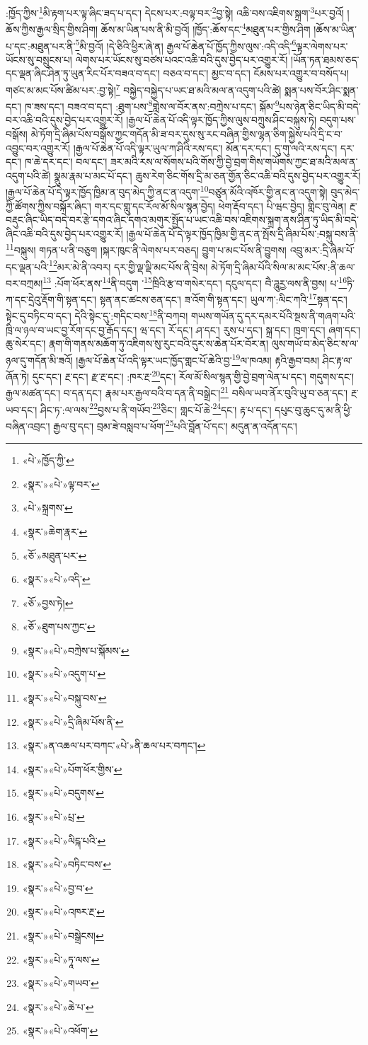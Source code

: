 :ཁྱོད་ཀྱིས་\footnote{«པེ་»ཁྱོད་ཀྱི་}མི་རྟག་པར་ལྟ་ཞིང་ཟད་པ་དང་། དེངས་པར་:བལྟ་བར་\footnote{«སྣར་»«པེ་»ལྟ་བར་}བྱ་སྟེ། འཆི་བས་འཇིགས་སྐྲག་\footnote{«པེ་»སྐྲགས་}པར་བྱའོ། །ཆོས་ཀྱིས་རྒྱལ་སྲིད་གྱིས་ཤིག། ཆོས་མ་ཡིན་པས་ནི་མི་བྱའོ། །ཁྱོད་:ཆོས་དང་\footnote{«སྣར་»ཆེག་རྣར་}མཐུན་པར་གྱིས་ཤིག །ཆོས་མ་ཡིན་པ་དང་:མཐུན་པར་ནི་\footnote{«ཅོ་»མཐུན་པར་}མི་བྱའོ། །དེ་ཅིའི་ཕྱིར་ཞེ་ན། རྒྱལ་པོ་ཆེན་པོ་ཁྱོད་ཀྱིས་ལུས་:འདི་འདི་\footnote{«སྣར་»«པེ་»འདི་}ལྟར་ལེགས་པར་ཡོངས་སུ་བསྲུངས་པ། ལེགས་པར་ཡོངས་སུ་བཙས་པའང་འཆི་བའི་དུས་བྱེད་པར་འགྱུར་རོ། །ཡོན་ཏན་ཐམས་ཅད་དང་ལྡན་ཞིང་ཤིན་ཏུ་ཡུན་རིང་པོར་བཟའ་བ་དང་། བཅའ་བ་དང་། མྱང་བ་དང་། ངོམས་པར་འགྱུར་བ་བསོད་པ། གཙང་མ་མང་པོས་ཚིམ་པར་:བྱ་སྟེ།\footnote{«ཅོ་»བྱས་ཏེ།} བསྐྱེད་བསྐྱེད་པ་ཡང་ཐ་མའི་མལ་ན་འདུག་པའི་ཚེ། སྨན་པས་བོར་ཤིང་སྨན་དང་། ཁ་ཟས་དང་། བཟའ་བ་དང་། :ཐུག་པས་\footnote{«ཅོ་»ཐུག་པས་ཀྱང་}གླེས་ལ་བོར་ནས་:བཀྲེས་པ་དང་། སྐོམ་\footnote{«སྣར་»«པེ་»བཀྲེས་པ་སྐོམས་}པས་ཉེན་ཅིང་ཡིད་མི་བདེ་བར་འཆི་བའི་དུས་བྱེད་པར་འགྱུར་རོ། །རྒྱལ་པོ་ཆེན་པོ་འདི་ལྟར་ཁྱོད་ཀྱིས་ལུས་བཀྲུས་ཤིང་བསྐུས་ཏེ། བདུག་པས་བསྒོས། མེ་ཏོག་དྲི་ཞིམ་པོས་བསྒོས་ཀྱང་གདོན་མི་ཟ་བར་དུས་སུ་རང་བཞིན་གྱིས་ལྷན་ཅིག་སྐྱེས་པའི་དྲི་ང་བ་འབྱུང་བར་འགྱུར་རོ། །རྒྱལ་པོ་ཆེན་པོ་འདི་ལྟར་ཡུལ་ཀ་ཤིའི་རས་དང་། མོན་དར་དང་། དུ་གུ་ལའི་རས་དང་། དར་དང་། ཁ་ཆེ་དར་དང་། བལ་དང་། ཟར་མའི་རས་ལ་སོགས་པའི་གོས་ཀྱི་བྱེ་བྲག་གིས་གཡོགས་ཀྱང་ཐ་མའི་མལ་ན་འདུག་པའི་ཚེ། སྣུམ་རྣམ་པ་མང་པོ་དང་། ཆུས་རེག་ཅིང་གོས་དྲི་མ་ཅན་གྱོན་ཅིང་འཆི་བའི་དུས་བྱེད་པར་འགྱུར་རོ། །རྒྱལ་པོ་ཆེན་པོ་དེ་ལྟར་ཁྱོད་ཁྱིམ་ན་བུད་མེད་ཀྱི་ནང་ན་འདུག་\footnote{«སྣར་»«པེ་»འདུག་པ་}བཙུན་མོའི་འཁོར་གྱི་ནང་ན་འདུག་སྟེ། བུད་མེད་ཀྱི་ཚོགས་ཀྱིས་བསྐོར་ཞིང་། གར་དང་གླུ་དང་རོལ་མོ་སིལ་སྙན་བྱེད། ཕེག་རྡོབ་དང་། པི་ཝང་བྱེད། གླིང་བུ་ལེན། རྔ་བརྡུང་ཞིང་ཡིད་བདེ་བར་རྩེ་དགའ་ཞིང་དགའ་མགུར་སྤྱོད་པ་ཡང་འཆི་བས་འཇིགས་སྐྲག་ནས་ཤིན་ཏུ་ཡིད་མི་བདེ་ཞིང་འཆི་བའི་དུས་བྱེད་པར་འགྱུར་རོ། །རྒྱལ་པོ་ཆེན་པོ་དེ་ལྟར་ཁྱོད་ཁྱིམ་གྱི་ནང་ན་སྤོས་དྲི་ཞིམ་པོས་:བསྐུ་བས་ནི་\footnote{«སྣར་»«པེ་»བསྐུ་བས་}བསྐུས། གཏན་པ་ནི་བཅུག །སྐར་ཁུང་ནི་ལེགས་པར་བཅད། བྱུག་པ་མང་པོས་ནི་བྱུགས། འབྲུ་མར་:དྲི་ཞིམ་པོ་དང་ལྡན་པའི་\footnote{«སྣར་»«པེ་»དྲི་ཞིམ་པོས་ནི་}མར་མེ་ནི་འབར། དར་གྱི་ལྡ་ལྡི་མང་པོས་ནི་བྲེས། མེ་ཏོག་དྲི་ཞིམ་པོའི་སིལ་མ་མང་པོས་:ནི་ཆལ་བར་བཀྲམ།\footnote{«སྣར་»ན་འཆལ་པར་བཀང་«པེ་»ནི་ཆལ་པར་བཀང་།} :པོག་ཕོར་ནས་\footnote{«སྣར་»«པེ་»པོག་ཕོར་གྱིས་}ནི་བདུག ་\footnote{«སྣར་»«པེ་»བདུགས་}ཁྲིའི་རྩ་བ་གསེར་དང་། དངུལ་དང་། བཻ་ཌཱུརྱ་ལས་ནི་བྱས། པ་\footnote{«སྣར་»«པེ་»པྲ་}ཏི་ཀ་དང་དྲེའུ་རྡོག་གི་སྟན་དང་། སྟན་ནང་ཚངས་ཅན་དང་། ཟ་འོག་གི་སྟན་དང་། ཡུལ་ཀ་:ལིང་ཀའི་\footnote{«སྣར་»«པེ་»ལིངྐ་པའི་}སྟན་དང་། སྟེང་དུ་བཏིང་བ་དང་། དེའི་སྟེང་དུ་:གདིང་བས་\footnote{«སྣར་»«པེ་»བཏིང་བས་}ནི་བཀབ། གཡས་གཡོན་དུ་དར་དམར་པོའི་སྔས་ནི་གཞག་པའི་ཁྲི་ལ་ཉལ་བ་ཡང་བྱ་རོག་དང་བྱ་རྒོད་དང་། ཝ་དང་། རོ་དང་། ཤ་དང་། རུས་པ་དང་། སྐྲ་དང་། ཁྲག་དང་། ཞག་དང་། ཆུ་སེར་དང་། རྣག་གི་གནས་མཆོག་ཏུ་འཇིགས་སུ་རུང་བའི་དུར་ས་ཆེན་པོར་བོར་ན། ལུས་གཡོ་བ་མེད་ཅིང་ས་ལ་ཉལ་དུ་གདོན་མི་ཟའོ། །རྒྱལ་པོ་ཆེན་པོ་འདི་ལྟར་ཡང་ཁྱོད་གླང་པོ་ཆེའི་བྱ་\footnote{«སྣར་»«པེ་»བྱ་བ་}ལ་ཁའམ། རྟའི་རྒྱབ་བམ། ཤིང་རྟ་ལ་ཞོན་ཏེ། དུང་དང་། རྔ་དང་། རྫ་རྔ་དང་། :ཁར་རྔ་\footnote{«སྣར་»«པེ་»འཁར་རྔ་}དང་། རོལ་མོ་སིལ་སྙན་གྱི་བྱེ་བྲག་ལེན་པ་དང་། གདུགས་དང་། རྒྱལ་མཚན་དང་། བ་དན་དང་། རྣམ་པར་རྒྱལ་བའི་བ་དན་ནི་བསྒྲེང་།\footnote{«སྣར་»«པེ་»བསྒྲེངས།} བསིལ་ཡབ་ནོར་བུའི་ཡུ་བ་ཅན་དང་། རྔ་ཡབ་དང་། ཤིང་ཏ་:ལ་ལས་\footnote{«སྣར་»«པེ་»ཏཱ་ལས་}བྱས་པ་ནི་གཡོབ་\footnote{«སྣར་»«པེ་»གཡབ་}ཅིང་། གླང་པོ་ཆེ་\footnote{«སྣར་»«པེ་»ཆེ་པ་}དང་། རྟ་པ་དང་། དཔུང་བུ་ཆུང་དུ་མ་ནི་ཕྱི་བཞིན་འབྲང་། རྒྱལ་བུ་དང་། བྲམ་ཟེ་བསླབ་པ་ཕོག་\footnote{«སྣར་»«པེ་»འཕོག་}པའི་བློན་པོ་དང་། མདུན་ན་འདོན་དང་། 